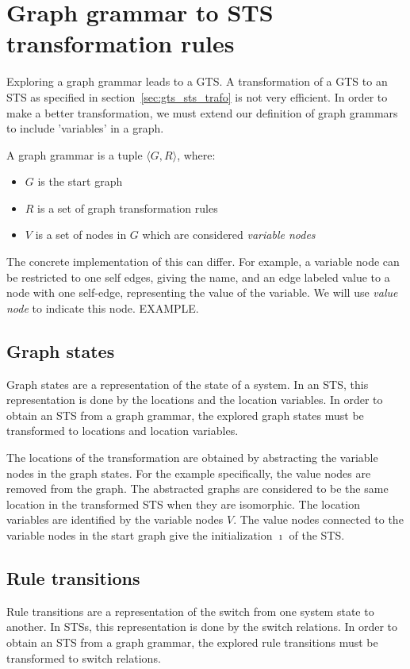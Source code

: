 \section{Graph grammar to STS transformation rules}

Exploring a graph grammar leads to a GTS. A transformation of a GTS to an STS as specified in section~\ref{sec:gts_sts_trafo} is not very efficient. In order to make a better transformation, we must extend our definition of graph grammars to include 'variables' in a graph.

\begin{definition}
A graph grammar is a tuple $\langle G, R\rangle$, where:
\begin{itemize}
  \item $G$ is the start graph
  \item $R$ is a set of graph transformation rules
  \item $V$ is a set of nodes in $G$ which are considered \textit{variable nodes}
\end{itemize}
\end{definition}

The concrete implementation of this can differ. For example, a variable node can be restricted to one self edges, giving the name, and an edge labeled value to a node with one self-edge, representing the value of the variable. We will use \textit{value node} to indicate this node. EXAMPLE.

\subsection{Graph states}
Graph states are a representation of the state of a system. In an STS, this representation is done by the locations and the location variables. In order to obtain an STS from a graph grammar, the explored graph states must be transformed to locations and location variables. 

The locations of the transformation are obtained by abstracting the variable nodes in the graph states. For the example specifically, the value nodes are removed from the graph. The abstracted graphs are considered to be the same location in the transformed STS when they are isomorphic. The location variables are identified by the variable nodes $V$. The value nodes connected to the variable nodes in the start graph give the initialization $\imath$ of the STS.

\subsection{Rule transitions}
Rule transitions are a representation of the switch from one system state to another. In STSs, this representation is done by the switch relations. In order to obtain an STS from a graph grammar, the explored rule transitions must be transformed to switch relations.

